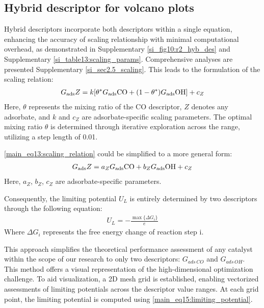 \subsection{Hybrid descriptor for volcano plots}
Hybrid descriptors incorporate both descriptors within a single equation, enhancing the accuracy of scaling relationship with minimal computational overhead, as demonstrated in Supplementary \cref{si_fig10:r2_hyb_des} and Supplementary \cref{si_table13:scaling_params}.
Comprehensive analyses are presented Supplementary \cref{si_sec2.5_scaling}. This leads to the formulation of the scaling relation:
\begin{align}
G_{\text{ads}} Z =
k[\theta^* G_{\text{ads}} \ce{CO} + (1-\theta^*) G_{\text{ads}} \ce{OH}] + c_Z  \label{main_eq13:scaling_relation}
\end{align}
Here, $\theta$ represents the mixing ratio of the CO descriptor, $\textit{Z}$ denotes any adsorbate, and $\textit{k}$ and $\textit{c}_{Z}$ are adsorbate-specific scaling parameters.
The optimal mixing ratio $\theta$ is determined through iterative exploration across the range, utilizing a step length of 0.01.

\ref{main_eq13:scaling_relation} could be simplified to a more general form:
\begin{align}
G_{\text{ads}} Z =
a_Z G_{\text{ads}} \ce{CO} + b_Z G_{\text{ads}} \ce{OH} + c_Z  \label{main_eq14:general_scaling_relation}
\end{align}
Here, $a_Z$, $b_Z$, $c_Z$ are adsorbate-specific parameters.

Consequently, the limiting potential $\textit{U}_{L}$ is entirely determined by two descriptors through the following equation:
\begin{align}
U_L = -\frac{\max\{ \Delta G_i \}}{e}  \label{main_eq15:limiting_potential}
\end{align}
Where $\Delta G_{i}$ represents the free energy change of reaction step i.

This approach simplifies the theoretical performance assessment of any catalyst within the scope of our research to only two descriptors: $G_{\textit{ads} \, \textit{CO}}$ and $G_{\textit{ads} \, \textit{OH}}$.
This method offers a visual representation of the high-dimensional optimization challenge.
To aid visualization, a 2D mesh grid is established, enabling vectorized assessments of limiting potentials across the descriptor value ranges.
At each grid point, the limiting potential is computed using \cref{main_eq15:limiting_potential}.


